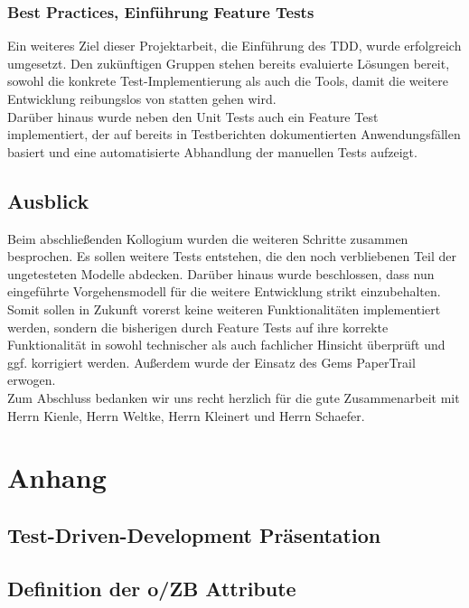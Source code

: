 \documentclass[12pt,             %
               a4paper,          %
               listof=totoc,     %
               index=totoc,      %
               bibliography=totoc,%
               oneside,         %
               BCOR1cm,          %
               english   %
               ]{scrbook}
\begin{document}
\subsection{Best Practices, Einführung Feature Tests}
Ein weiteres Ziel dieser Projektarbeit, die Einführung des TDD, wurde erfolgreich umgesetzt. Den zukünftigen Gruppen stehen bereits evaluierte Lösungen bereit, sowohl die konkrete Test-Implementierung als auch die Tools, damit die weitere Entwicklung reibungslos von statten gehen wird.\\
Darüber hinaus wurde neben den Unit Tests auch ein Feature Test implementiert, der auf bereits in Testberichten dokumentierten Anwendungsfällen basiert und eine automatisierte Abhandlung der manuellen Tests aufzeigt.

\section{Ausblick}
Beim abschließenden Kollogium wurden die weiteren Schritte zusammen besprochen. Es sollen weitere Tests entstehen, die den noch verbliebenen Teil der ungetesteten Modelle abdecken. Darüber hinaus wurde beschlossen, dass nun eingeführte Vorgehensmodell für die weitere Entwicklung strikt einzubehalten. Somit sollen in Zukunft vorerst keine weiteren Funktionalitäten implementiert werden, sondern die bisherigen durch Feature Tests auf ihre korrekte Funktionalität in sowohl technischer als auch fachlicher Hinsicht überprüft und ggf. korrigiert werden. Außerdem wurde der Einsatz des Gems PaperTrail erwogen.\\

Zum Abschluss bedanken wir uns recht herzlich für die gute Zusammenarbeit mit Herrn Kienle, Herrn Weltke, Herrn Kleinert und Herrn Schaefer.

\clearpage
\appendix
\chapter{Anhang}\label{sec:appendix}
\section{Test-Driven-Development Präsentation}

\clearpage
\section{Definition der o/ZB Attribute}
\label{chapter:ozb_attribute}

\end{document}
